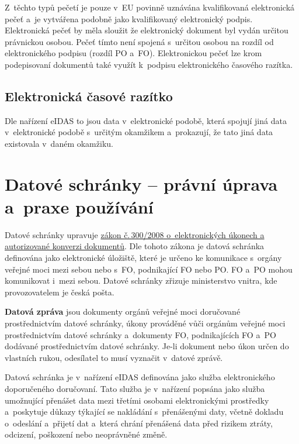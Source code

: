 Z~těchto typů pečetí je pouze v~EU povinně uznávána kvalifikovaná elektronická pečeť a~je vytvářena podobně jako kvalifikovaný elektronický podpis. Elektronická pečeť by měla sloužit že elektronický dokument byl vydán určitou právnickou osobou. Pečeť tímto není spojená s~určitou osobou na rozdíl od elektronického podpisu (rozdíl PO a~FO).
Elektronickou pečeť lze krom podepisovaní dokumentů také využít k~podpisu elektronického časového razítka.

\vspace{-0,4cm}
\subsection{Elektronická časové razítko} Dle nařízení eIDAS to jsou data v~elektronické podobě, která spojují jiná data v~elektronické podobě s~určitým okamžikem a~prokazují, že tato jiná data existovala v~daném okamžiku.







\clearpage
\section{Datové schránky -- právní úprava a~praxe používání}

Datové schránky upravuje \href{https://www.zakonyprolidi.cz/cs/2008-300}{zákon č.\,300/2008 o~elektronických úkonech a autorizované konverzi dokumentů}. Dle tohoto zákona je datová schránka definována jako elektronické úložiště, které je určeno ke komunikace s~orgány veřejné moci mezi sebou nebo s~FO, podnikající FO nebo PO. FO a~PO mohou komunikovat i~mezi sebou. Datové schránky zřizuje ministerstvo vnitra, kde provozovatelem je česká pošta. 

\textbf{Datová zpráva} jsou dokumenty orgánů veřejné moci doručované prostřednictvím datové schránky, úkony prováděné vůči orgánům veřejné moci prostřednictvím datové schránky a~dokumenty FO, podnikajících FO a~PO dodávané prostřednictvím datové schránky. Je-li dokument nebo úkon určen do vlastních rukou, odesílatel to musí vyznačit v~datové zprávě. 

Datová schránka je v~nařízení eIDAS definována jako služba elektronického doporučeného doručovaní. Tato služba je v~nařízení popsána jako služba umožnující přenášet data mezi třetími osobami elektronickými prostředky a~poskytuje důkazy týkající se nakládání s~přenášenými daty, včetně dokladu o~odeslání a~přijetí dat a~která chrání přenášená data před rizikem ztráty, odcizení, poškození nebo neoprávněné změně.

